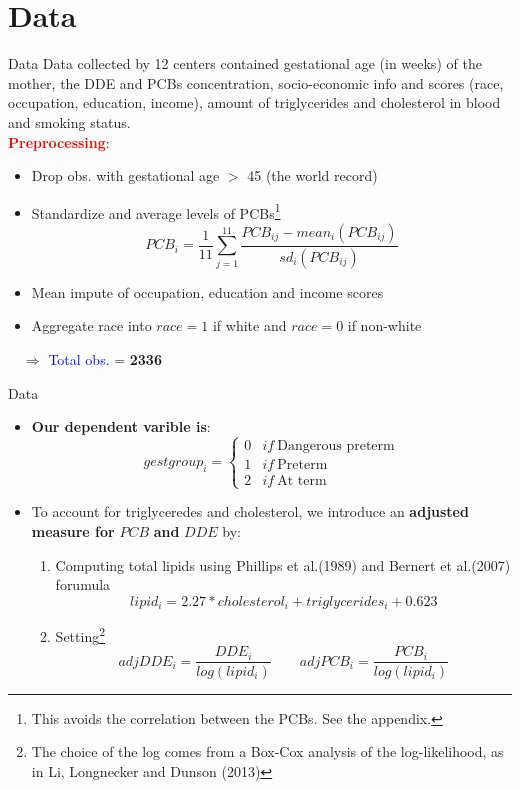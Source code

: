 \documentclass{beamer}\usepackage[]{graphicx}\usepackage[]{color}
\begin{document}
\section{Data}
\begin{frame}{Data}
Data collected by 12 centers contained gestational age (in weeks) of the mother, the DDE and PCBs concentration, socio-economic info and scores (race, occupation, education, income), amount of triglycerides and cholesterol in blood and smoking status. \\
\medskip 
\textcolor{red}{\textbf{Preprocessing}}:
\begin{itemize}
\item Drop obs. with gestational age $>$ 45 (the world record)
\item Standardize and average levels of PCBs\footnote{This avoids the correlation between the PCBs. See the appendix.}
$$PCB_i = \frac{1}{11}\sum_{j=1}^{11} \frac{PCB_{ij} - mean_i(PCB_{ij})}{sd_i(PCB_{ij})}$$
\item Mean impute of occupation, education and income scores 
\item Aggregate race into $race = 1$ if white and $race=0$ if non-white
\end{itemize}
$\quad \Longrightarrow$ \textcolor{blue}{Total obs.} = \textbf{2336}
\end{frame}
\begin{frame}{Data}
\small
\begin{itemize}
\item \textbf{Our dependent varible is}:
$$gestgroup_i = 
\begin{cases}
0 & if \ \textrm{Dangerous preterm} \\
1 & if \ \textrm{Preterm} \\
2 & if \ \textrm{At term} 
\end{cases}$$
\item To account for triglyceredes and cholesterol, we introduce an \textbf{adjusted measure for} $PCB$ \textbf{and} $DDE$ by:
\begin{enumerate}
\item Computing total lipids using Phillips et al.(1989) and Bernert et al.(2007) forumula $$lipid_i =  2.27 * cholesterol_i + triglycerides_i + 0.623$$ 
\item Setting\footnote{The choice of the log comes from a Box-Cox analysis of the log-likelihood, as in Li, Longnecker and Dunson (2013)}
$$adjDDE_i = \frac{DDE_i}{log(lipid_i)} \qquad adjPCB_i = \frac{PCB_i}{log(lipid_i)}$$
\end{enumerate}
\end{itemize}
\end{frame}
\end{document}
